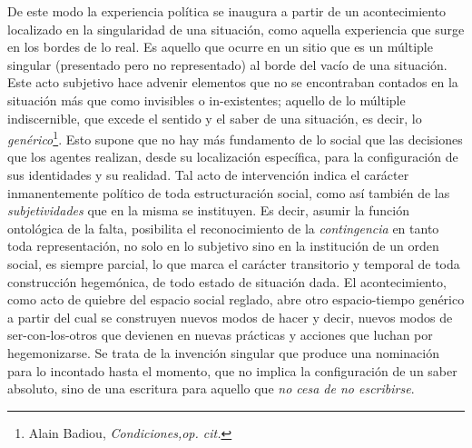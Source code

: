 \documentclass{book}
\begin{document}
De este modo la experiencia política se inaugura a partir de un
acontecimiento localizado en la singularidad de una situación, como
aquella experiencia que surge en los bordes de lo real. Es aquello que
ocurre en un sitio que es un múltiple singular (presentado pero no
representado) al borde del vacío de una situación. Este acto subjetivo
hace advenir elementos que no se encontraban contados en la situación
más que como invisibles o in-existentes; aquello de lo múltiple
indiscernible, que excede el sentido y el saber de una situación, es
decir, lo \emph{genérico}\footnote{Alain Badiou, \emph{Condiciones,op.
  cit.}}. Esto supone que no hay más fundamento de lo social que las
decisiones que los agentes realizan, desde su localización específica,
para la configuración de sus identidades y su realidad. Tal acto de
intervención indica el carácter inmanentemente político de toda
estructuración social, como así también de las \emph{subjetividades} que
en la misma se instituyen. Es decir, asumir la función ontológica de la
falta, posibilita el reconocimiento de la \emph{contingencia} en tanto
toda representación, no solo en lo subjetivo sino en la institución de
un orden social, es siempre parcial, lo que marca el carácter
transitorio y temporal de toda construcción hegemónica, de todo estado
de situación dada. El acontecimiento, como acto de quiebre del espacio
social reglado, abre otro espacio-tiempo genérico a partir del cual se
construyen nuevos modos de hacer y decir, nuevos modos de
ser-con-los-otros que devienen en nuevas prácticas y acciones que luchan
por hegemonizarse. Se trata de la invención singular que produce una
nominación para lo incontado hasta el momento, que no implica la
configuración de un saber absoluto, sino de una escritura para aquello
que \emph{no cesa de no escribirse}.
\end{document}
